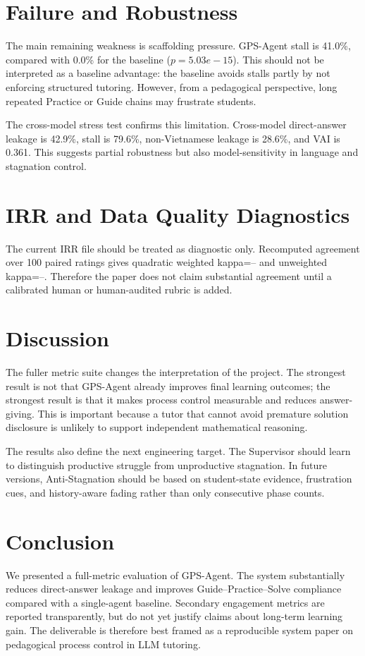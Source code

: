 \documentclass[11pt]{article}
\begin{document}
\section{Failure and Robustness}
The main remaining weakness is scaffolding pressure. GPS-Agent stall is 41.0\%, compared with 0.0\% for the baseline ($p=5.03e-15$). This should not be interpreted as a baseline advantage: the baseline avoids stalls partly by not enforcing structured tutoring. However, from a pedagogical perspective, long repeated Practice or Guide chains may frustrate students.

The cross-model stress test confirms this limitation. Cross-model direct-answer leakage is 42.9\%, stall is 79.6\%, non-Vietnamese leakage is 28.6\%, and VAI is 0.361. This suggests partial robustness but also model-sensitivity in language and stagnation control.

\section{IRR and Data Quality Diagnostics}
The current IRR file should be treated as diagnostic only. Recomputed agreement over 100 paired ratings gives quadratic weighted kappa=-- and unweighted kappa=--. Therefore the paper does not claim substantial agreement until a calibrated human or human-audited rubric is added.

\section{Discussion}
The fuller metric suite changes the interpretation of the project. The strongest result is not that GPS-Agent already improves final learning outcomes; the strongest result is that it makes process control measurable and reduces answer-giving. This is important because a tutor that cannot avoid premature solution disclosure is unlikely to support independent mathematical reasoning.

The results also define the next engineering target. The Supervisor should learn to distinguish productive struggle from unproductive stagnation. In future versions, Anti-Stagnation should be based on student-state evidence, frustration cues, and history-aware fading rather than only consecutive phase counts.

\section{Conclusion}
We presented a full-metric evaluation of GPS-Agent. The system substantially reduces direct-answer leakage and improves Guide--Practice--Solve compliance compared with a single-agent baseline. Secondary engagement metrics are reported transparently, but do not yet justify claims about long-term learning gain. The deliverable is therefore best framed as a reproducible system paper on pedagogical process control in LLM tutoring.
\end{document}
